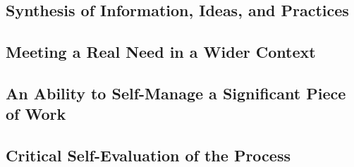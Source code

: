 \documentclass[12pt]{article}
\begin{document}
\subsection{Synthesis of Information, Ideas, and Practices}

\subsection{Meeting a Real Need in a Wider Context}

\subsection{An Ability to Self-Manage a Significant Piece of Work}

\subsection{Critical Self-Evaluation of the Process}


\printbibliography
\end{document}

